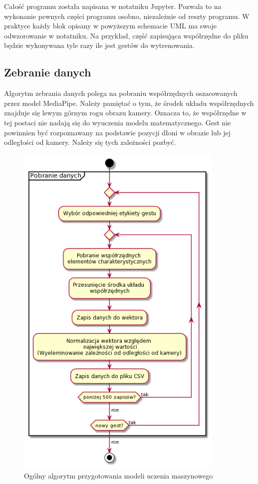 \quad Całość programu została napisana w notatniku Jupyter. Pozwala to na wykonanie pewnych części programu osobno, niezależnie od reszty programu. W praktyce każdy blok opisany w powyższym schemacie UML ma swoje odwzorowanie w notatniku. Na przykład, część zapisująca współrzędne do pliku będzie wykonywana tyle razy ile jest gestów do wytrenowania. 

\subsection{Zebranie danych}
\quad Algorytm zebrania danych polega na pobraniu współrzędnych oszacowanych przez model MediaPipe. Należy pamiętać o tym, że środek układu współrzędnych znajduje się lewym górnym rogu obrazu kamery. Oznacza to, że współrzędne w tej postaci nie nadają się do wyuczenia modelu matematycznego. Gest nie powinnien być rozpoznawany na podstawie pozycji dłoni w obrazie lub jej odległości od kamery. Należy się tych zależności pozbyć. 

\begin{figure}[H]
    \begin{center}
        \includegraphics[width=10cm]{../images/get_data.png}
        \caption{Ogólny algorytm przygotowania modeli uczenia maszynowego}
    \end{center}
\end{figure}

